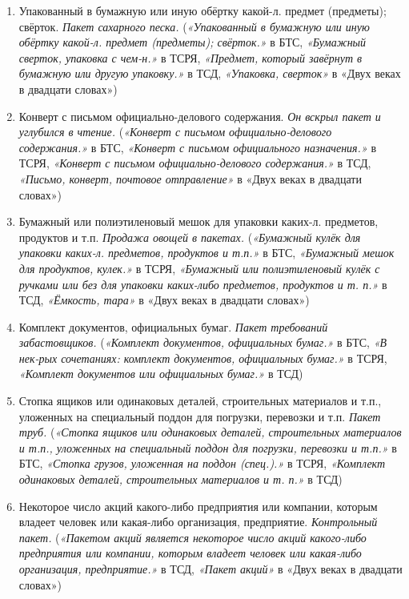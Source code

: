 \documentclass[LI,VKR]{HSEUniversity}
\begin{document}
\begin{enumerate}
    \item Упакованный в бумажную или иную обёртку какой-л. предмет (предметы); свёрток. \textit{Пакет сахарного песка.}
(\textit{«Упакованный в бумажную или иную обёртку какой-л. предмет (предметы); свёрток.»} в БТС,
\textit{«Бумажный сверток, упаковка с чем-н.»} в ТСРЯ,
\textit{«Предмет, который завёрнут в бумажную или другую упаковку.»} в ТСД,
\textit{«Упаковка, сверток»} в «Двух веках в двадцати словах»)

    \item Конверт с письмом официально-делового содержания. \textit{Он вскрыл пакет и углубился в чтение.}
(\textit{«Конверт с письмом официально-делового содержания.»} в БТС,
\textit{«Конверт с письмом официального назначения.»} в ТСРЯ,
\textit{«Конверт с письмом официально-делового содержания.»} в ТСД,
\textit{«Письмо, конверт, почтовое отправление»} в «Двух веках в двадцати словах»)

    \item Бумажный или полиэтиленовый мешок для упаковки каких-л. предметов, продуктов и т.п. \textit{Продажа овощей в пакетах.}
(\textit{«Бумажный кулёк для упаковки каких-л. предметов, продуктов и т.п.»} в БТС,
\textit{«Бумажный мешок для продуктов, кулек.»} в ТСРЯ,
\textit{«Бумажный или полиэтиленовый кулёк с ручками или без для упаковки каких-либо предметов, продуктов и т. п.»} в ТСД, \textit{«Ёмкость, тара»} в «Двух веках в двадцати словах»)

    \item Комплект документов, официальных бумаг. \textit{Пакет требований забастовщиков.}
(\textit{«Комплект документов, официальных бумаг.»} в БТС,
\textit{«В нек-рых сочетаниях: комплект документов, официальных бумаг.»} в ТСРЯ,
\textit{«Комплект документов или официальных бумаг.»} в ТСД)

    \item Стопка ящиков или одинаковых деталей, строительных материалов и т.п., уложенных на специальный поддон для погрузки, перевозки и т.п. \textit{Пакет труб.}
(\textit{«Стопка ящиков или одинаковых деталей, строительных материалов и т.п., уложенных на специальный поддон для погрузки, перевозки и т.п.»} в БТС,
\textit{«Стопка грузов, уложенная на поддон (спец.).»} в ТСРЯ,
\textit{«Комплект одинаковых деталей, строительных материалов и т. п.»} в ТСД)

    \item Некоторое число акций какого-либо предприятия или компании, которым владеет человек или какая-либо организация, предприятие. \textit{Контрольный пакет.}
(\textit{«Пакетом акций является некоторое число акций какого-либо предприятия или компании, которым владеет человек или какая-либо организация, предприятие.»} в ТСД,
\textit{«Пакет акций»} в «Двух веках в двадцати словах»)


\end{enumerate}
\end{document}
